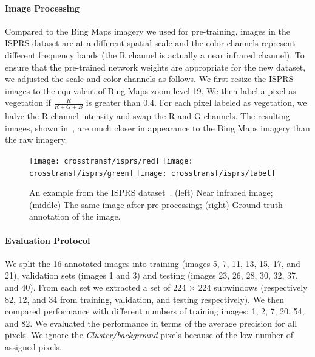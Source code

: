 \paragraph{Image Processing} Compared to the Bing Maps imagery we used
for pre-training, images in the ISPRS dataset are at a
different spatial scale and the color channels represent different
frequency bands (the R channel is actually a near infrared channel).
To ensure that the pre-trained network weights are appropriate for
the new dataset, we adjusted the scale and color channels as follows.
We first resize the ISPRS images to the equivalent of Bing Maps
zoom level 19.  We then label a pixel as vegetation if
$\frac{R}{R+G+B}$ is greater than 0.4. For each pixel labeled as
vegetation, we halve the R channel intensity and swap the R and G
channels.  The resulting images, shown in~, are
much closer in appearance to the Bing Maps imagery than the raw
imagery.

\begin{figure}
  \newlength{\abc}
  \setlength{\abc}{.325\linewidth}
	\texttt{[image: crosstransf/isprs/red]}
	\texttt{[image: crosstransf/isprs/green]}
	\texttt{[image: crosstransf/isprs/label]}
  \caption{An example from the ISPRS dataset~\cite{rottensteiner2013isprs}. 
  (left) Near infrared image; (middle) The same image after pre-processing; 
  (right) Ground-truth annotation of the image.}
	\label{fig:isprs:dataset}
\end{figure}


\paragraph{Evaluation Protocol} We split the 16 annotated images into
training (images 5, 7, 11, 13, 15, 17, and 21), validation sets
(images 1 and 3) and testing (images 23, 26, 28, 30, 32, 37, and 40).
From each set we extracted a set of 224 $\times$ 224 subwindows
(respectively 82, 12, and 34 from training, validation, and testing
respectively).
We then compared performance with different numbers of training
images: 1, 2, 7, 20, 54, and 82. We evaluated the performance in terms
of the average precision for all pixels.  We ignore the
\textit{Cluster/background} pixels because of the low number of
assigned pixels.

